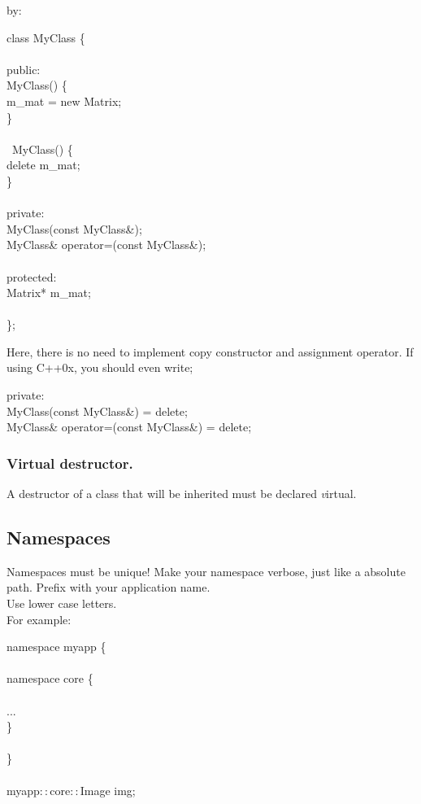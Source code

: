 by:
\begin{algorithm}[H]
class MyClass \{ \\
 \\
public: \\
MyClass() \{ \\
m\_mat = new Matrix; \\
\} \\
 \\
~MyClass() \{ \\
delete m\_mat; \\
\} \\
 \\
private: \\
MyClass(const MyClass\&); \\
MyClass\& operator=(const MyClass\&); \\
 \\
protected: \\
Matrix* m\_mat; \\
 \\
\};
\end{algorithm}

Here, there is no need to implement copy constructor and assignment operator.
If using C++0x, you should even write;
\begin{algorithm}[H]
private: \\
MyClass(const MyClass\&) = delete; \\
MyClass\& operator=(const MyClass\&) = delete;
\end{algorithm}


\subsubsection{Virtual destructor.}
A destructor of a class that will be inherited must be declared {\emph virtual}.

\subsection{Namespaces}
Namespaces must be unique! Make your namespace verbose, just like a
absolute path. Prefix with your application name.\\
Use lower case letters.\\

For example:
\begin{algorithm}[H]
namespace myapp \{ \\
 \\
namespace core \{ \\
 \\
... \\
\} \\
 \\
\} \\
 \\
myapp$::$core$::$Image img;
\end{algorithm}

